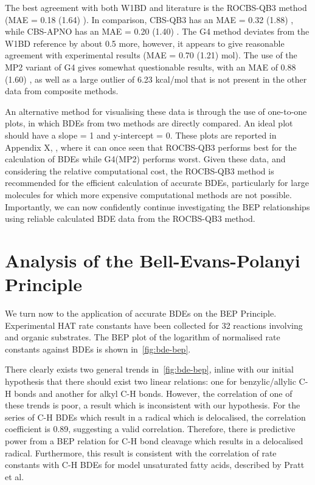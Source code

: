 The best agreement with both W1BD and literature is the ROCBS-QB3 method (MAE = 0.18 (1.64) \kcalmol). In comparison, CBS-QB3 has an MAE = 0.32 (1.88) \kcalmol, while CBS-APNO has an MAE = 0.20 (1.40) \kcalmol.  The G4 method deviates from the W1BD reference by about 0.5 \kcalmol more, however, it appears to give reasonable agreement with experimental results (MAE = 0.70 (1.21) mol). The use of the MP2 variant of G4 gives somewhat questionable results, with an MAE of 0.88 (1.60) \kcalmol, as well as a large outlier of 6.23 kcal/mol that is not present in the other data from composite methods.

An alternative method for visualising these data is through the use of one-to-one plots, in which BDEs from two methods are directly compared. An ideal plot should have a slope = 1 and y-intercept = 0. These plots are reported in Appendix X, , where it can once seen that ROCBS-QB3 performs best for the calculation of BDEs while G4(MP2) performs worst. Given these data, and considering the relative computational cost, the ROCBS-QB3 method is recommended for the efficient calculation of accurate BDEs, particularly for large molecules for which more expensive computational methods are not possible. Importantly, we can now confidently continue investigating the BEP relationships using reliable calculated BDE data from the ROCBS-QB3 method.

\section{Analysis of the Bell-Evans-Polanyi Principle}

We turn now to the application of accurate BDEs on the BEP Principle. Experimental HAT rate constants have been collected for 32 reactions involving \cumo and organic substrates. The BEP plot of the logarithm of normalised rate constants against BDEs is shown in~\ref{fig:bde-bep}.

There clearly exists two general trends in~\ref{fig:bde-bep}, inline with our initial hypothesis that there should exist two linear relations: one for benzylic/allylic C-H bonds and another for alkyl C-H bonds. However, the correlation of one of these trends is poor, a result which is inconsistent with our hypothesis. For the series of C-H BDEs which result in a radical which is delocalised, the correlation coefficient is 0.89, suggesting a valid correlation. Therefore, there is predictive power from a BEP relation for C-H bond cleavage which results in a delocalised radical. Furthermore, this result is consistent with the correlation of rate constants with C-H BDEs for model unsaturated fatty acids, described by Pratt et al.\cite{Pratt2003}

